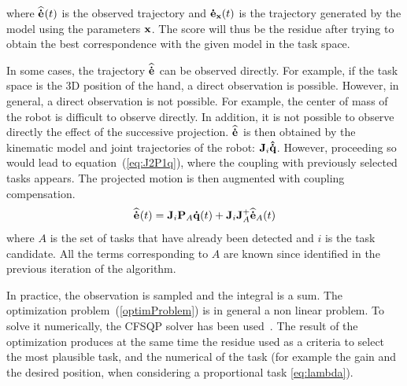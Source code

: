 \documentclass[journal]{IEEEtran}
\begin{document}
\noindent where ${\mathbf{\widehat{\dot{e}}}}_{}(t)$ is the observed trajectory and ${\mathbf{\dot{e}}}_{{\mathbf{x}}}(t)$ is the trajectory
generated by the model using the parameters ${\mathbf{x}}$.
The score will thus be the residue after trying to obtain the best correspondence with the given
model in the task space.

In some cases, the trajectory ${\mathbf{\widehat{\dot{e}}}}_{}$ can be observed directly. For example, if the task space 
is the 3D position of the hand, a direct observation is possible.
However, in general, a direct observation is not possible. For example,
the center of mass of the robot is difficult to observe directly. 
In addition, it is not possible to observe directly the effect of the successive projection. 
${\mathbf{\widehat{\dot{e}}}}_{}$ is then obtained by the kinematic model and 
joint trajectories of the robot: ${\mathbf{J}}_i{\mathbf{\hat{\dot{q}}}}$.
However, proceeding so would lead to equation~(\ref{eq:J2P1q}), where the coupling with previously
selected tasks appears. The projected motion is then augmented with coupling compensation.
\begin{equation}
  \medoth{}(t) = \mbf{J}_i\mbf{P}_A \mbf{\dot{q}}(t) + \mbf{J}_i\mbf{J}_A^+\medoth{A}(t)
  \label{eq:compensation}
\end{equation}
where $A$ is the set of tasks that have already been detected and $i$ is the task candidate.
All the terms corresponding to $A$ are known since identified in the previous
iteration of the algorithm.


\medskip
In practice, the observation is sampled and the integral is a sum.
The optimization problem~(\ref{optimProblem}) is in general a non linear problem. To solve
it numerically, the CFSQP solver has been used~\cite{lawrence97}. The result of the optimization produces at the same time the residue used as a criteria to select the most plausible task, and the numerical of the task (for example the gain and the desired position, when considering a proportional task \eqref{eq:lambda}).
\end{document}
